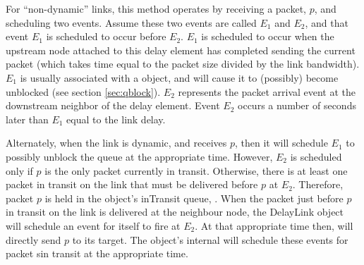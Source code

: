 For ``non-dynamic'' links,
this method operates by receiving a packet, $p$,  and scheduling two
events.
Assume these two events are called $E_1$ and $E_2$, and that
event $E_1$ is scheduled to occur before $E_2$.
$E_1$ is scheduled to occur when the upstream node attached to this
delay element has completed sending the current packet
(which takes time equal to the packet size divided by the link bandwidth).
$E_1$ is usually associated with a  object, and will
cause it to (possibly) become unblocked (see section \ref{sec:qblock}).
$E_2$ represents the packet arrival event at the downstream neighbor
of the delay element.
Event $E_2$ occurs a number of seconds later than $E_1$ equal to the
link delay.

Alternately, when the link is dynamic, and receives  $p$, then
it will schedule $E_1$ to possibly unblock the queue at the
appropriate time.
However, $E_2$ is scheduled only
if $p$ is the only packet currently in transit.
Otherwise, there is at least one packet in transit on the link that must
be delivered before $p$ at $E_2$.
Therefore, packet $p$ is held in the object's inTransit queue, .
When the packet just before $p$ in transit on the link is delivered
at the neighbour node, 
the DelayLink object will schedule an event for itself to fire at $E_2$.
At that appropriate time then, 
will directly send $p$ to its target.
The object's internal
will schedule these events for packet sin transit at the appropriate time.



